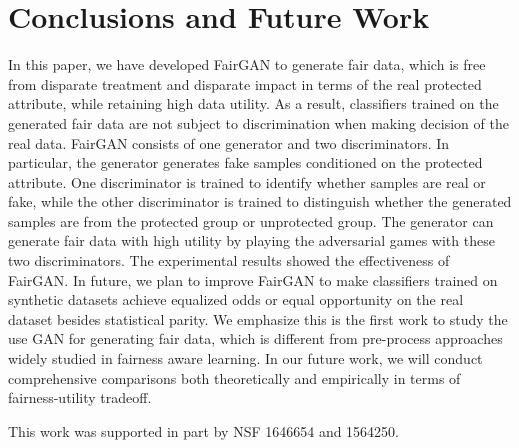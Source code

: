 \documentclass[sigconf]{acmart}
\theoremstyle{definition}
\begin{document}
\section{Conclusions and Future Work}
In this paper, we have developed FairGAN to generate fair data, which is free from disparate treatment and disparate impact in terms of  the real protected attribute, while retaining high data utility. As a result, classifiers trained on the generated fair data are not subject to discrimination when making decision of the real data. FairGAN consists of one generator and two discriminators. In particular, the generator generates fake samples conditioned on the protected attribute. One discriminator is trained to identify whether samples are real or fake, while the other discriminator is trained to distinguish whether the generated samples are from the protected group or unprotected group. The generator can generate fair data with high utility by playing the adversarial games with these two discriminators. The experimental results showed the effectiveness of FairGAN.  In future, we plan to improve FairGAN to make classifiers trained on synthetic datasets achieve equalized odds or equal opportunity on the real dataset besides statistical parity. We emphasize this is the first work to study the use GAN for generating fair data, which is different from pre-process approaches \cite{Kamiran2009Classifying,Kamiran2012Data,Zhang2017Achieving,Feldman2015Certifying} widely studied in fairness aware learning. In our future work, we will conduct comprehensive comparisons both theoretically and empirically in terms of fairness-utility tradeoff. 

\begin{acks}
This work was supported in part by NSF 1646654 and 1564250.
\end{acks}



\end{document}
